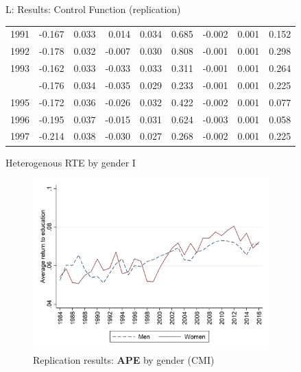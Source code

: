 \documentclass[10pt,ignorenonframetext,]{beamer}
\begin{document}
\begin{frame}{L: Results: Control Function (replication)}
\begin{longtable}[t]{rrrrrrrrr}
1991 & -0.167 & 0.033 & 0.014 & 0.034 & 0.685 & -0.002 & 0.001 & 0.152\\
1992 & -0.178 & 0.032 & -0.007 & 0.030 & 0.808 & -0.001 & 0.001 & 0.298\\
1993 & -0.162 & 0.033 & -0.033 & 0.033 & 0.311 & -0.001 & 0.001 & 0.264\\
\addlinespace
1994 & -0.176 & 0.034 & -0.035 & 0.029 & 0.233 & -0.001 & 0.001 & 0.225\\
1995 & -0.172 & 0.036 & -0.026 & 0.032 & 0.422 & -0.002 & 0.001 & 0.077\\
1996 & -0.195 & 0.037 & -0.015 & 0.031 & 0.624 & -0.003 & 0.001 & 0.058\\
1997 & -0.214 & 0.038 & -0.030 & 0.027 & 0.268 & -0.002 & 0.001 & 0.225\\*
\end{longtable}\endgroup{}

\end{frame}

\begin{frame}{Heterogenous RTE by gender I}
\protect\hypertarget{heterogenous-rte-by-gender-i}{}

\begin{figure}
\centering
\includegraphics[width=\textwidth,height=2.60417in]{img/results_sex.png}
\caption{Replication results: \textbf{APE} by gender (CMI)}
\end{figure}

\end{frame}
\end{document}
